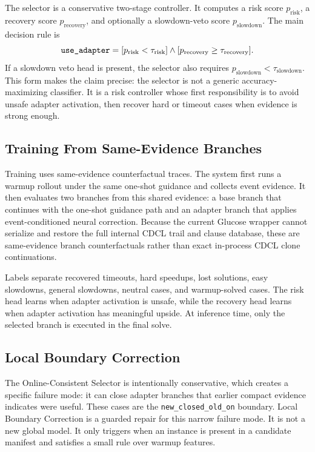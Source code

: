 \documentclass[11pt]{article}
\begin{document}
The selector is a conservative two-stage controller. It computes a risk score $p_{\mathrm{risk}}$, a recovery score $p_{\mathrm{recovery}}$, and optionally a slowdown-veto score $p_{\mathrm{slowdown}}$. The main decision rule is
\[
\text{\ttfamily use\_adapter}
= [p_{\mathrm{risk}} < \tau_{\mathrm{risk}}]
  \wedge [p_{\mathrm{recovery}} \ge \tau_{\mathrm{recovery}}].
\]
If a slowdown veto head is present, the selector also requires $p_{\mathrm{slowdown}} < \tau_{\mathrm{slowdown}}$. This form makes the claim precise: the selector is not a generic accuracy-maximizing classifier. It is a risk controller whose first responsibility is to avoid unsafe adapter activation, then recover hard or timeout cases when evidence is strong enough.

\subsection{Training From Same-Evidence Branches}

Training uses same-evidence counterfactual traces. The system first runs a warmup rollout under the same one-shot guidance and collects event evidence. It then evaluates two branches from this shared evidence: a base branch that continues with the one-shot guidance path and an adapter branch that applies event-conditioned neural correction. Because the current Glucose wrapper cannot serialize and restore the full internal CDCL trail and clause database, these are same-evidence branch counterfactuals rather than exact in-process CDCL clone continuations.

Labels separate recovered timeouts, hard speedups, lost solutions, easy slowdowns, general slowdowns, neutral cases, and warmup-solved cases. The risk head learns when adapter activation is unsafe, while the recovery head learns when adapter activation has meaningful upside. At inference time, only the selected branch is executed in the final solve.

\subsection{Local Boundary Correction}

The Online-Consistent Selector is intentionally conservative, which creates a specific failure mode: it can close adapter branches that earlier compact evidence indicates were useful. These cases are the \texttt{new\_closed\_old\_on} boundary. Local Boundary Correction is a guarded repair for this narrow failure mode. It is not a new global model. It only triggers when an instance is present in a candidate manifest and satisfies a small rule over warmup features.
\end{document}
